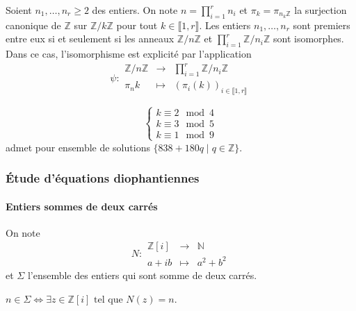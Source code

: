 	\begin{theorem}[Chinois]
		Soient $n_1, \dots, n_r \geq 2$ des entiers. On note $n = \prod_{i=1}^r n_i$ et $\pi_k = \pi_{{n_k}\mathbb{Z}}$ la surjection canonique de $\mathbb{Z}$ sur $\mathbb{Z}/k\mathbb{Z}$ pour tout $k \in \llbracket 1, r \rrbracket$.
		\newpar
		Les entiers $n_1, \dots, n_r$ sont premiers entre eux si et seulement si les anneaux $\mathbb{Z}/n\mathbb{Z}$ et $\prod_{i=1}^{r}\mathbb{Z}/n_i\mathbb{Z}$ sont isomorphes. Dans ce cas, l'isomorphisme est explicité par l'application
		\[
			\psi :
			\begin{array}{ccc}
				\mathbb{Z}/n\mathbb{Z} &\rightarrow& \prod_{i=1}^{r}\mathbb{Z}/n_i\mathbb{Z} \\
				\pi_{n}{k} &\mapsto& (\pi_i(k))_{i \in \llbracket 1, r \rrbracket}
			\end{array}
		\]
	\end{theorem}
	
	
	\begin{example}
		\[
			\begin{cases}
				k \equiv 2 \mod 4 \\
				k \equiv 3 \mod 5 \\
				k \equiv 1 \mod 9
			\end{cases}
		\]
		admet pour ensemble de solutions $\{ 838+180q \mid q \in \mathbb{Z} \}$.
	\end{example}
	
	\subsubsection{Étude d'équations diophantiennes}
	
	\paragraph{Entiers sommes de deux carrés}
	
	
	\begin{notation}
		On note \[ N :
		\begin{array}{ccc}
			\mathbb{Z}[i] &\rightarrow& \mathbb{N} \\
			a+ib &\mapsto& a^2 + b^2
		\end{array}
		\] et $\Sigma$ l'ensemble des entiers qui sont somme de deux carrés.
	\end{notation}
	
	\begin{remark}
		$n \in \Sigma \iff \exists z \in \mathbb{Z}[i] \text{ tel que } N(z)=n$.
	\end{remark}
	
